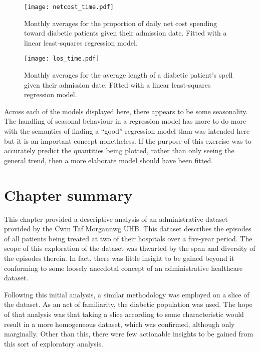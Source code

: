 \begin{figure}
    \centering
    \texttt{[image: netcost\_time.pdf]}
    \caption{Monthly averages for the proportion of daily net cost spending
        toward diabetic patients given their admission date. Fitted with a
        linear least-squares regression model.}%
    \label{fig:netcost_proportions}
\end{figure}

\begin{figure}
    \centering
    \texttt{[image: los\_time.pdf]}
    \caption{Monthly averages for the average length of a diabetic patient's
        spell given their admission date. Fitted with a linear least-squares
        regression model.}%
    \label{fig:los_time}
\end{figure}

Across each of the models displayed here, there appears to be some seasonality.
The handling of seasonal behaviour in a regression model has more to do more
with the semantics of finding a ``good'' regression model than was intended here
but it is an important concept nonetheless. If the purpose of this exercise was
to accurately predict the quantities being plotted, rather than only seeing the
general trend, then a more elaborate model should have been fitted.


\section{Chapter summary}\label{sec:summary}

This chapter provided a descriptive analysis of an administrative dataset
provided by the Cwm Taf Morgannwg UHB. This dataset describes the episodes of
all patients being treated at two of their hospitals over a five-year period.
The scope of this exploration of the dataset was thwarted by the span and
diversity of the episodes therein. In fact, there was little insight to be
gained beyond it conforming to some loosely anecdotal concept of an
administrative healthcare dataset.

Following this initial analysis, a similar methodology was employed on a slice
of the dataset. As an act of familiarity, the diabetic population was used. The
hope of that analysis was that taking a slice according to some characteristic
would result in a more homogeneous dataset, which was confirmed, although only
marginally. Other than this, there were few actionable insights to be gained
from this sort of exploratory analysis.

